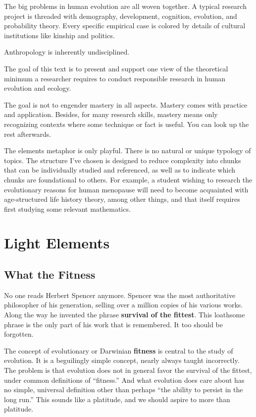 \documentclass[10pt,reqno]{amsbook}
\newcommand{\bemph}[1]{{\textbf{\textcolor{bemphcol}{#1}}}}
\numberwithin{equation}{chapter}
\begin{document}
The big problems in human evolution are all woven together. A typical research project is threaded with demography, development, cognition, evolution, and probability theory. Every specific empirical case is colored by details of cultural institutions like kinship and politics. 

Anthropology is inherently undisciplined. 

The goal of this text is to present and support one view of the theoretical minimum a researcher requires to conduct responsible research in human evolution and ecology.

The goal is not to engender mastery in all aspects. Mastery comes with practice and application. Besides, for many research skills, mastery means only recognizing contexts where some technique or fact is useful. You can look up the rest afterwards.  

The elements metaphor is only playful. There is no natural or unique typology of topics. The structure I've chosen is designed to reduce complexity into chunks that can be individually studied and referenced, as well as to indicate which chunks are foundational to others. For example, a student wishing to research the evolutionary reasons for human menopause will need to become acquainted with age-structured life history theory, among other things, and that itself requires first studying some relevant mathematics. 

\mainmatter

\linenumbers
\modulolinenumbers[5]


\part{Light Elements}


\def \chapterElement {F}
\chapter{What the Fitness}\label{link1F}

No one reads Herbert Spencer anymore. Spencer was the most authoritative philosopher of his generation, selling over a million copies of his various works. Along the way he invented the phrase \bemph{survival of the fittest}. This loathsome phrase is the only part of his work that is remembered. It too should be forgotten.

The concept of evolutionary or Darwinian \bemph{fitness} is central to the study of evolution. It is a beguilingly simple concept, nearly always taught incorrectly. The problem is that evolution does not in general favor the survival of the fittest, under common definitions of ``fitness.'' And what evolution does care about has no simple, universal definition other than perhaps ``the ability to persist in the long run.'' This sounds like a platitude, and we should aspire to more than platitude. 
\end{document}
